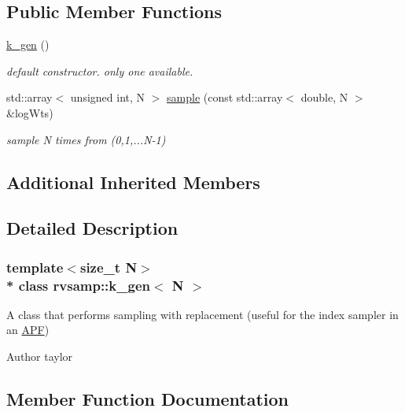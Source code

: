 \subsection*{Public Member Functions}
\begin{DoxyCompactItemize}
\item 
\hyperlink{classrvsamp_1_1k__gen_a3f3f0cd14ebf47d18796c713e834306c}{k\+\_\+gen} ()\hypertarget{classrvsamp_1_1k__gen_a3f3f0cd14ebf47d18796c713e834306c}{}\label{classrvsamp_1_1k__gen_a3f3f0cd14ebf47d18796c713e834306c}

\begin{DoxyCompactList}\small\item\em default constructor. only one available. \end{DoxyCompactList}\item 
std\+::array$<$ unsigned int, N $>$ \hyperlink{classrvsamp_1_1k__gen_a00221f2eab38faaf602a25b626f184d6}{sample} (const std\+::array$<$ double, N $>$ \&log\+Wts)
\begin{DoxyCompactList}\small\item\em sample N times from (0,1,...N-\/1) \end{DoxyCompactList}\end{DoxyCompactItemize}
\subsection*{Additional Inherited Members}


\subsection{Detailed Description}
\subsubsection*{template$<$size\+\_\+t N$>$\\*
class rvsamp\+::k\+\_\+gen$<$ N $>$}

A class that performs sampling with replacement (useful for the index sampler in an \hyperlink{classAPF}{A\+PF}) 

\begin{DoxyAuthor}{Author}
taylor 
\end{DoxyAuthor}


\subsection{Member Function Documentation}
